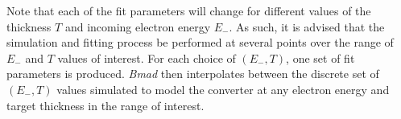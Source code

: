 \documentclass[12pt]{article}
\begin{document}
Note that each of the fit parameters will change for different values of the thickness $T$ and incoming electron energy $E_-$.
As such, it is advised that the simulation and fitting process be performed at several points over the range of $E_-$ and $T$ values of interest.
For each choice of $(E_-, T)$, one set of fit parameters is produced.
\textit{Bmad} then interpolates between the discrete set of $(E_-, T)$ values simulated to model the converter at any electron energy and target thickness in the range of interest.



\printbibliography
\end{document}
